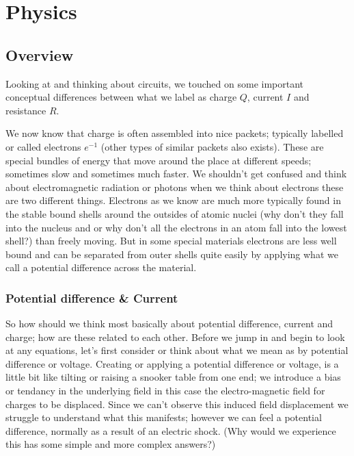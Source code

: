 \chapter{Physics}
\label{ch:physics}

\section{Overview}

Looking at and thinking about circuits, we touched on some important conceptual differences between what we label as charge $Q$, current $I$ and resistance $R$. 

We now know that charge is often assembled into nice packets; typically labelled or called electrons $ e^{-1}$ (other types of similar packets also exists). These are special bundles of energy that move around the place at different speeds; sometimes slow and sometimes much faster. We shouldn't get confused and think about electromagnetic radiation or photons when we think about electrons these are two different things. 
Electrons as we know are much more typically found in the stable bound shells around the outsides of atomic nuclei (why don't they fall into the nucleus and or why don't all the electrons in an atom fall into the lowest shell?) than freely moving. But in some special materials electrons are less well bound and can be separated from outer shells quite easily by applying what we call a potential difference across the material. 

\subsection{Potential difference \& Current}

So how should we think most basically about potential difference, current and charge; how are these related to each other. Before we jump in and begin to look at any equations, let's first consider or think about what we mean as by  potential difference or voltage. Creating or applying a potential difference or voltage, is a little bit like tilting or raising a snooker table from one end; we introduce a bias or tendancy in the underlying field in this case the electro-magnetic field for charges to be displaced. Since we can't observe this induced field displacement we struggle to understand what this manifests; however we can feel a potential difference, normally as a result of an electric shock. (Why would we experience this has some simple and more complex answers?)


